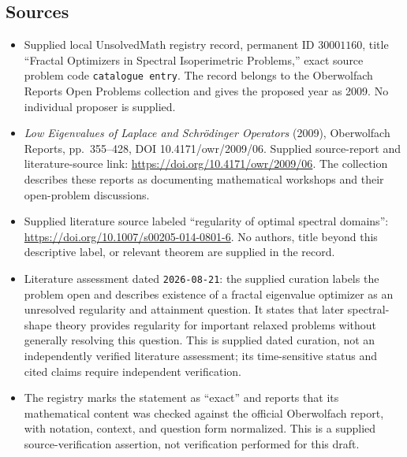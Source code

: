 \documentclass[11pt]{article}
\begin{document}
\subsection{Sources}
\begin{itemize}
\item Supplied local UnsolvedMath registry record, permanent ID \(30001160\), title ``Fractal Optimizers in Spectral Isoperimetric Problems,'' exact source problem code \texttt{catalogue entry}. The record belongs to the Oberwolfach Reports Open Problems collection and gives the proposed year as 2009. No individual proposer is supplied.
\item \emph{Low Eigenvalues of Laplace and Schrödinger Operators} (2009), Oberwolfach Reports, pp.~355--428, DOI 10.4171/owr/2009/06. Supplied source-report and literature-source link: \url{https://doi.org/10.4171/owr/2009/06}. The collection describes these reports as documenting mathematical workshops and their open-problem discussions.
\item Supplied literature source labeled ``regularity of optimal spectral domains'': \url{https://doi.org/10.1007/s00205-014-0801-6}. No authors, title beyond this descriptive label, or relevant theorem are supplied in the record.
\item Literature assessment dated \texttt{2026-08-21}: the supplied curation labels the problem open and describes existence of a fractal eigenvalue optimizer as an unresolved regularity and attainment question. It states that later spectral-shape theory provides regularity for important relaxed problems without generally resolving this question. This is supplied dated curation, not an independently verified literature assessment; its time-sensitive status and cited claims require independent verification.
\item The registry marks the statement as ``exact'' and reports that its mathematical content was checked against the official Oberwolfach report, with notation, context, and question form normalized. This is a supplied source-verification assertion, not verification performed for this draft.
\end{itemize}
\end{document}
